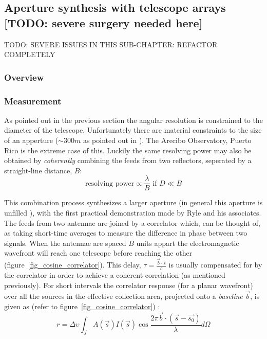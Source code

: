 \documentclass[a4paper,10pt]{report}
\begin{document}
\subsection{Aperture synthesis with telescope arrays [TODO: severe surgery needed here]}
{\color{red} TODO: SEVERE ISSUES IN THIS SUB-CHAPTER: REFACTOR COMPLETELY}
\subsubsection{Overview}
\subsubsection{Measurement}
As pointed out in the previous section the angular resolution is constrained to the diameter of the telescope. Unfortunately there are material constraints to the size of an apperture ($\sim 300m$ as pointed out in \cite{wilson2009tools}). The Arecibo Observatory, Puerto Rico is the extreme case 
of this. Luckily the same resolving power may also be obtained by \textit{coherently} combining the feeds from two reflectors, seperated by a straight-line distance, $B$:
\begin{equation*}
 \text{resolving power} \propto \frac{\lambda}{B} \text{ if } D\ll B
\end{equation*}

This combination process synthesizes a larger aperture (in general this aperture is unfilled \cite{christiansenradiotelescopes}), with the first practical demonstration made by Ryle and his associates. The feeds from two antennae are joined by a 
correlator which, can be thought of, as taking short-time averages to measure the difference in phase between two signals. When the antennae are spaced $B$ units appart the electromagnetic wavefront will reach one telescope before reaching the 
other (figure~\ref{fig_cosine_correlator}). This delay, $\tau=\frac{\vec{b}\cdot\hat{s}}{c}$ is usually compensated for by the correlator in order to achieve a coherent correlation (as mentioned previously). For short intervals the correlator 
response (for a planar wavefront) over all the sources in the effective collection area, projected onto a \textit{baseline} $\vec{b}$, is given as (refer to figure~\ref{fig_cosine_correlator}) \cite{taylor1999synthesis}:
\begin{equation}
\label{eqn_cosine_correlation}
r=\Delta\upsilon \int_{\vec{s}}{A(\vec{s})I(\vec{s})\cos{\frac{2\pi\vec{b}\cdot(\vec{s}-\vec{s_0})}{\lambda}}d\Omega}
\end{equation}
\end{document}
